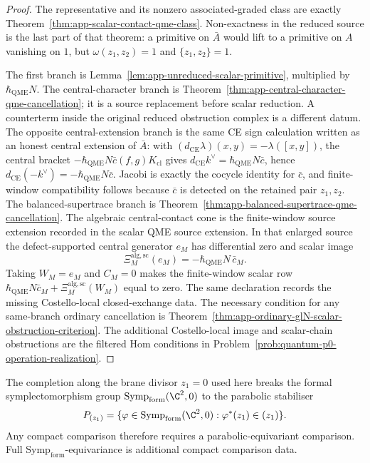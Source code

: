 \documentclass[11pt]{memoir}
\begin{document}
\begin{proof}
  The representative and its nonzero associated-graded class are exactly
  Theorem~\ref{thm:app-scalar-contact-qme-class}.  Non-exactness in the
  reduced source is the last part of that theorem: a primitive on
  \(\bar A\) would lift to a primitive on \(A\) vanishing on \(1\), but
  \(\omega(z_1,z_2)=1\) and \(\{z_1,z_2\}=1\).

  The first branch is Lemma~\ref{lem:app-unreduced-scalar-primitive},
  multiplied by \(\hbar_{\mathrm{QME}}N\).  The central-character branch is
  Theorem~\ref{thm:app-central-character-qme-cancellation}; it is a
  source replacement before scalar reduction. A counterterm inside the
  original reduced obstruction complex is a different datum.  The opposite central-extension
  branch is the same CE sign calculation written as an honest central
  extension of \(\bar A\): with
  \((d_{\mathrm{CE}}\lambda)(x,y)=-\lambda([x,y])\), the central bracket
  \(-\hbar_{\mathrm{QME}}N\bar c(f,g)K_{\mathrm{cl}}\) gives
  \(d_{\mathrm{CE}}k^\vee=\hbar_{\mathrm{QME}}N\bar c\), hence
  \(d_{\mathrm{CE}}(-k^\vee)=-\hbar_{\mathrm{QME}}N\bar c\).  Jacobi is exactly the
  cocycle identity for \(\bar c\), and finite-window compatibility follows
  because \(\bar c\) is detected on the retained pair \(z_1,z_2\).  The
  balanced-supertrace branch is
  Theorem~\ref{thm:app-balanced-supertrace-qme-cancellation}.  The
  algebraic central-contact cone is the finite-window source extension
  recorded in the scalar QME source extension.  In that enlarged source
  the defect-supported central generator \(e_M\) has differential zero and
  scalar image
  \[
    \Xi^{\mathrm{alg},\mathrm{sc}}_M(e_M)
      =-\hbar_{\mathrm{QME}}N\,\bar c_M .
  \]
  Taking \(W_M=e_M\) and \(C_M=0\) makes the finite-window scalar row
  \(\hbar_{\mathrm{QME}}N\bar c_M
    +\Xi^{\mathrm{alg},\mathrm{sc}}_M(W_M)\) equal to
  zero.  The same declaration
  records the missing Costello-local closed-exchange data.  The
  necessary condition for any same-branch ordinary cancellation is
  Theorem~\ref{thm:app-ordinary-glN-scalar-obstruction-criterion}.  The
  additional Costello-local image and scalar-chain obstructions are the
  filtered Hom conditions in
  Problem~\ref{prob:quantum-p0-operation-realization}.
\end{proof}

\begin{rmk}\label{rmk:parabolic-functoriality}
  The completion along the brane divisor \(z_1=0\) used here breaks the
  formal symplectomorphism group \(\mathrm{Symp}_{\mathrm{form}}(\C^2,0)\)
  to the parabolic stabiliser
  \[
    P_{(z_1)}=
    \{\varphi\in\mathrm{Symp}_{\mathrm{form}}(\C^2,0):
      \varphi^*(z_1)\in (z_1)\}.
  \]
		  Any compact comparison therefore requires a parabolic-equivariant
	  comparison.  Full \(\mathrm{Symp}_{\mathrm{form}}\)-equivariance is
	  additional compact comparison data.
\end{rmk}
\end{document}
